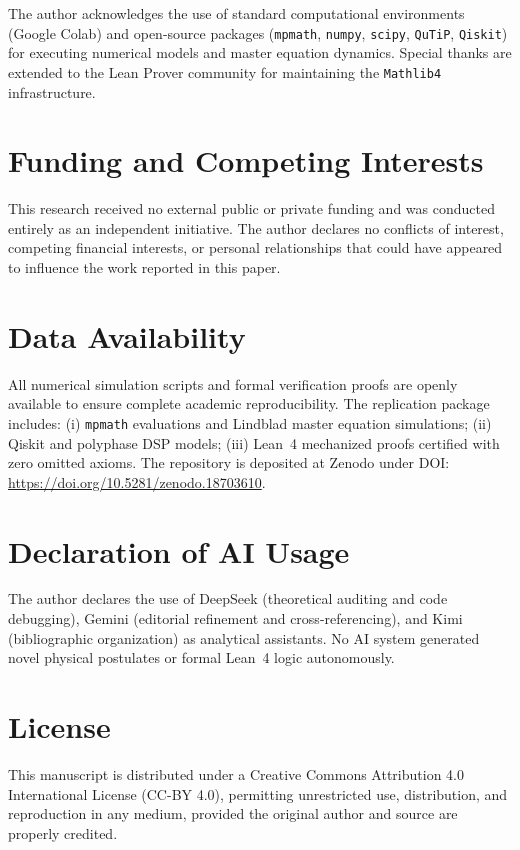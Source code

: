 \documentclass[aps,pra,twocolumn,10pt,superscriptaddress]{revtex4-2}
\begin{document}

\begin{acknowledgments}
The author acknowledges the use of standard computational environments (Google Colab) and open-source packages (\texttt{mpmath}, \texttt{numpy}, \texttt{scipy}, \texttt{QuTiP}, \texttt{Qiskit}) for executing numerical models and master equation dynamics. Special thanks are extended to the Lean Prover community for maintaining the \texttt{Mathlib4} infrastructure.
\end{acknowledgments}

\section*{Funding and Competing Interests}
This research received no external public or private funding and was conducted entirely as an independent initiative. The author declares no conflicts of interest, competing financial interests, or personal relationships that could have appeared to influence the work reported in this paper.

\section*{Data Availability}
All numerical simulation scripts and formal verification proofs are openly available to ensure complete academic reproducibility. The replication package includes: (i) \texttt{mpmath} evaluations and Lindblad master equation simulations; (ii) Qiskit and polyphase DSP models; (iii) Lean~4 mechanized proofs certified with zero omitted axioms. The repository is deposited at Zenodo under DOI: \url{https://doi.org/10.5281/zenodo.18703610}.

\section*{Declaration of AI Usage}
The author declares the use of DeepSeek (theoretical auditing and code debugging), Gemini (editorial refinement and cross-referencing), and Kimi (bibliographic organization) as analytical assistants. No AI system generated novel physical postulates or formal Lean~4 logic autonomously.

\section*{License}
This manuscript is distributed under a Creative Commons Attribution 4.0 International License (CC-BY 4.0), permitting unrestricted use, distribution, and reproduction in any medium, provided the original author and source are properly credited.
\end{document}

